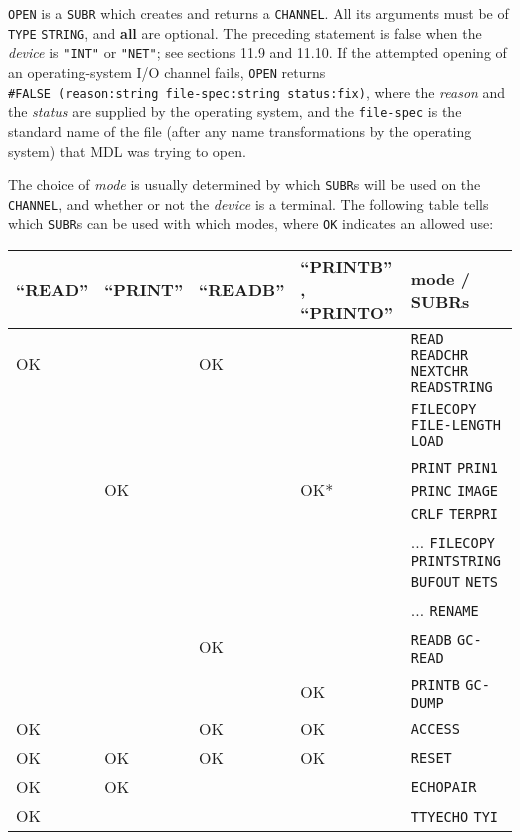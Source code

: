 \documentclass[a4paper]{scrbook}
\begin{document}
\texttt{OPEN}  is a \texttt{SUBR} which creates and returns a \texttt{CHANNEL}. All its
arguments must be of \texttt{TYPE} \texttt{STRING}, and \textbf{all} are optional. The preceding statement is false when
the \emph{device} is \texttt{"INT"} or \texttt{"NET"}; see sections 11.9 and 11.10. If the attempted opening of an
operating-system I/O channel fails, \texttt{OPEN} returns \texttt{\#FALSE\ (reason:string\ file-spec:string\ status:fix)},
where the \emph{reason} and the \emph{status} are supplied by the operating system, and the \texttt{file-spec} is the
standard name of the file (after any name transformations by the operating system) that MDL was trying to open.

The choice of \emph{mode} is usually determined by which \texttt{SUBR}s will be used on the \texttt{CHANNEL}, and whether
or not the \emph{device} is a terminal. The following table tells which \texttt{SUBR}s can be used with which modes, where
\texttt{OK} indicates an allowed use:

\begin{longtable}[]{@{}lllll@{}}
\toprule
``READ'' \index{\texttt{""READ""}} & ``PRINT'' \index{\texttt{PRINT}} & ``READB'' \index{\texttt{""READB""}} & ``PRINTB''
\index{\texttt{""PRINTB""}}, ``PRINTO'' \index{\texttt{""PRINTO""}|textbf} & mode / SUBRs\tabularnewline
\midrule
\endhead
OK & & OK & & \texttt{READ} \texttt{READCHR} \index{\texttt{READCHR}} \texttt{NEXTCHR} \index{\texttt{NEXTCHR}}
\texttt{READSTRING} \index{\texttt{READSTRING}}\tabularnewline
& & & & \texttt{FILECOPY} \texttt{FILE-LENGTH} \index{\texttt{FILE-LENGTH}} \texttt{LOAD}
\index{\texttt{LOAD}}\tabularnewline
& OK & & OK* & \texttt{PRINT} \index{\texttt{""PRINT""}|textbf} \texttt{PRIN1} \index{\texttt{PRIN1}} \texttt{PRINC}
\index{\texttt{PRINC}} \texttt{IMAGE} \index{\texttt{IMAGE}} \texttt{CRLF} \index{\texttt{CRLF}} \texttt{TERPRI}
\index{\texttt{TERPRI}}\tabularnewline
& & & & \(\ldots\) \texttt{FILECOPY} \index{\texttt{FILECOPY}} \texttt{PRINTSTRING} \index{\texttt{PRINTSTRING}}
\texttt{BUFOUT} \index{\texttt{BUFOUT}} \texttt{NETS} \index{\texttt{NETS}}\tabularnewline
& & & & \(\ldots\) \texttt{RENAME} \index{\texttt{RENAME}}\tabularnewline
& & OK & & \texttt{READB} \texttt{GC-READ} \index{\texttt{GC-READ}}\tabularnewline
& & & OK & \texttt{PRINTB} \texttt{GC-DUMP} \index{\texttt{GC-DUMP}}\tabularnewline
OK & & OK & OK & \texttt{ACCESS} \index{\texttt{ACCESS}}\tabularnewline
OK & OK & OK & OK & \texttt{RESET} \index{\texttt{RESET}}\tabularnewline
OK & OK & & & \texttt{ECHOPAIR} \index{\texttt{ECHOPAIR}}\tabularnewline
OK & & & & \texttt{TTYECHO} \index{\texttt{TTYECHO}} \texttt{TYI} \index{\texttt{TYI}}\tabularnewline
\bottomrule
\end{longtable}
\end{document}

